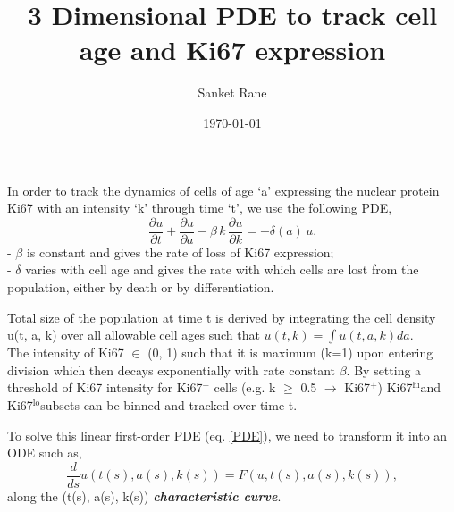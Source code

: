 \documentclass[11pt]{article}
\title{3 Dimensional PDE to track cell age and Ki67 expression}
\author{Sanket Rane}
\date{\today}
\newcommand{\khi}{Ki67$^\text{hi}$}
\newcommand{\klo}{Ki67$^\text{lo}$}
\begin{document}
 
	\maketitle

In order to track the dynamics of cells of age `a' expressing the nuclear protein Ki67 with an intensity `k' through time `t', we use the following PDE,
\begin{equation}
	\frac{\partial u}{\partial t} +\frac{\partial u}{\partial a} - \beta \, k \, \frac{\partial u}{\partial k}  = - \delta(a) \, u.
	\label{PDE}
\end{equation}
- $\beta$ is constant and gives the rate of loss of Ki67 expression; \\
- $\delta$ varies with cell age  and gives the rate with which cells are lost from the population, either by death or by differentiation.

Total size of the population at time t is derived by integrating the cell density u(t, a, k) over all allowable cell ages such that $u(t, k) = \int u(t, a, k) da$. \\
The intensity of Ki67 $\in$ (0, 1) such that it is maximum (k=1) upon entering division which then decays exponentially with rate constant $\beta$.  
By setting a threshold of Ki67 intensity for Ki67$^{+}$ cells (e.g. k $\ge$ 0.5 $\rightarrow$ Ki67$^{+}$) \khi and \klo subsets can be binned and tracked over time t.

To solve this linear first-order PDE (eq. \ref{PDE}), we need to transform it into an ODE such as,
\begin{equation}
	\frac{d}{ds}u(t(s), a(s), k(s)) = F(u, t(s), a(s), k(s)),
	\label{ODE}
\end{equation}
along the (t(s), a(s), k(s)) \textbf{\textit{characteristic curve}}. 
\end{document}
